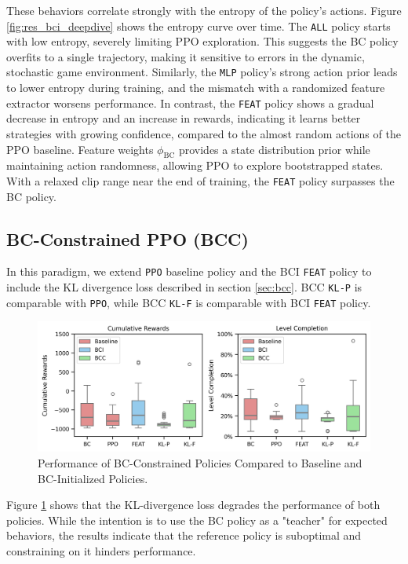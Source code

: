 \documentclass{article}
\begin{document}
These behaviors correlate strongly with the entropy of the policy's 
actions. Figure \ref{fig:res_bci_deepdive} shows the entropy curve over 
time. The \texttt{ALL} policy starts with low entropy, severely limiting 
PPO exploration. This suggests the BC policy overfits to a single 
trajectory, making it sensitive to errors in the dynamic, stochastic 
game environment. Similarly, the \texttt{MLP} policy's strong action 
prior leads to lower entropy during training, and the mismatch with a 
randomized feature extractor worsens performance. In contrast, the 
\texttt{FEAT} policy shows a gradual decrease in entropy and an increase 
in rewards, indicating it learns better strategies with growing 
confidence, compared to the almost random actions of the PPO baseline.
Feature weights $\phi_{\text{BC}}$ provides a state distribution prior while 
maintaining action randomness, allowing PPO to explore bootstrapped 
states. With a relaxed clip range near the end of training, the 
\texttt{FEAT} policy surpasses the BC policy.


\subsection{BC-Constrained PPO (BCC)}

In this paradigm, we extend \texttt{PPO} baseline policy and the BCI \texttt{FEAT}
policy to include the KL divergence loss described in section \ref{sec:bcc}.
BCC \texttt{KL-P} is comparable with \texttt{PPO}, while BCC \texttt{KL-F} is comparable
with BCI \texttt{FEAT} policy.

\begin{figure}[htbp]
      \centering
      \includegraphics[width=\columnwidth]{figures/cum_rewards_bcc.png}
      \caption{Performance of BC-Constrained Policies Compared to Baseline 
      and BC-Initialized Policies.}
      \label{fig:res_bcc}
\end{figure}
Figure \ref{fig:res_bcc} shows that the KL-divergence loss degrades the 
performance of both policies. While the intention is to use the BC policy 
as a "teacher" for expected behaviors, the results indicate that the 
reference policy is suboptimal and constraining on it hinders performance.
\end{document}
